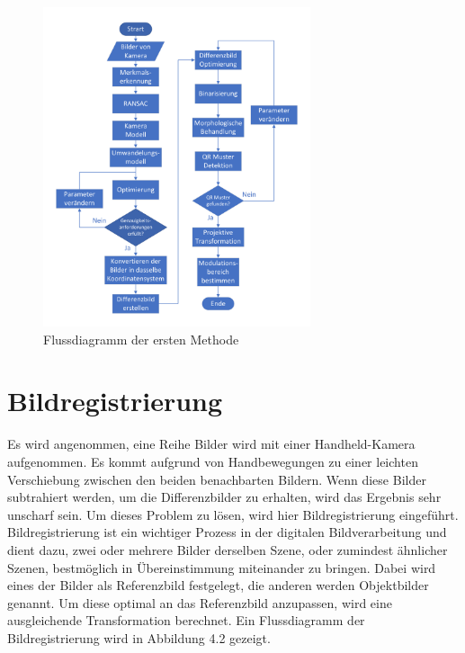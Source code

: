 \begin{figure}[H]
 \centering 
 \includegraphics[keepaspectratio,width=0.70\textwidth]{images/3_Ersteverfahren/Flussdiagrammsum.pdf}
 \caption{Flussdiagramm der ersten Methode}
 \label{fig:Flussdiagramm der Methode}
\end{figure}

\section{Bildregistrierung} 

Es wird angenommen, eine Reihe Bilder wird mit einer Handheld-Kamera aufgenommen. Es kommt aufgrund von Handbewegungen zu einer leichten Verschiebung zwischen den beiden benachbarten Bildern. Wenn diese Bilder subtrahiert werden, um die Differenzbilder zu erhalten, wird das Ergebnis sehr unscharf sein. Um dieses Problem zu lösen, wird hier Bildregistrierung eingeführt. Bildregistrierung ist ein wichtiger Prozess in der digitalen Bildverarbeitung und dient dazu, zwei oder mehrere Bilder derselben Szene, oder zumindest ähnlicher Szenen, bestmöglich in Übereinstimmung miteinander zu bringen. Dabei wird eines der Bilder als Referenzbild festgelegt, die anderen werden Objektbilder genannt. Um diese optimal an das Referenzbild anzupassen, wird eine ausgleichende Transformation berechnet. Ein Flussdiagramm der Bildregistrierung wird in Abbildung 4.2 gezeigt. 


